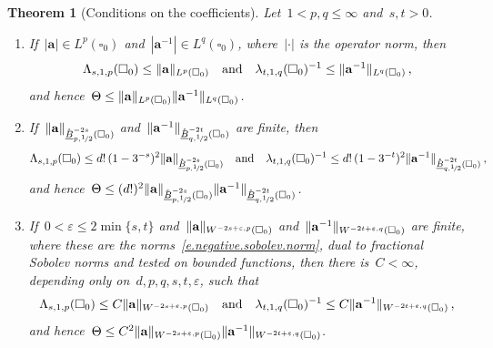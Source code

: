 \documentclass[11pt,letterpaper]{article}
\numberwithin{equation}{section}
\newtheorem{theoremA}{Theorem}
\theoremstyle{definition}
\renewcommand{\a}{\mathbf{a}}
\newcommand{\eps}{\varepsilon}
\newcommand{\nf}{\nicefrac}
\newcommand{\qand}{\quad\mbox{and}\quad}
\newcommand{\cu}{\square}
\DeclarePairedDelimiter{\norm}{\lVert}{\rVert}
\begin{document}
\begin{theoremA}[Conditions on the coefficients]
\label{t.coefficient.conditions}
Let~$1<p,q\leq\infty$ and~$s,t>0$.
\begin{enumerate}[label=\textup{(\roman*)},wide]
\item\label{c.classical.moments} If~$|\a|\in L^p(\cu_0)$ and~$|\a^{-1}|\in L^q(\cu_0)$, where~$|\cdot|$ is the operator norm, then
\begin{equation}
	\Lambda_{s,1,p}(\cu_0)\leq\norm{\a}_{L^p(\cu_0)}\qand \lambda_{t,1,q}(\cu_0)^{-1}\leq\norm{\a^{-1}}_{L^q(\cu_0)}\,,
	\label{e.classical.series}
\end{equation}
and hence~$\Theta\leq\norm{\a}_{L^p(\cu_0)}\norm{\a^{-1}}_{L^q(\cu_0)}$.
\item\label{c.negative.regularity} If~$\norm{\a}_{\mathring{\underline B}^{-2s}_{p,\nf12}(\cu_0)}$ and~$\norm{\a^{-1}}_{\mathring{\underline B}^{-2t}_{q,\nf12}(\cu_0)}$ are finite, then
\begin{equation}
	\Lambda_{s,1,p}(\cu_0)\leq d!\,(1-3^{-s})^2\norm{\a}_{\mathring{\underline B}^{-2s}_{p,\nf12}(\cu_0)}\qand\lambda_{t,1,q}(\cu_0)^{-1}\leq d!\,(1-3^{-t})^2\norm{\a^{-1}}_{\mathring{\underline B}^{-2t}_{q,\nf12}(\cu_0)}\,,
	\label{e.negative.regularity.series}
\end{equation}
and hence~$\Theta\leq(d!)^2\norm{\a}_{\mathring{\underline B}^{-2s}_{p,\nf12}(\cu_0)}\norm{\a^{-1}}_{\mathring{\underline B}^{-2t}_{q,\nf12}(\cu_0)}$.
\item\label{c.negative.sobolev} If~$0<\eps\leq2\min\{s,t\}$ and~$\norm{\a}_{W^{-2s+\eps,p}(\cu_0)}$ and~$\norm{\a^{-1}}_{W^{-2t+\eps,q}(\cu_0)}$ are finite, where these are the norms~\eqref{e.negative.sobolev.norm}, dual to fractional Sobolev norms and tested on bounded functions, then there is~$C<\infty$, depending only on~$d,p,q,s,t,\eps$, such that
\begin{equation}
	\Lambda_{s,1,p}(\cu_0)\leq C\norm{\a}_{W^{-2s+\eps,p}(\cu_0)}\qand\lambda_{t,1,q}(\cu_0)^{-1}\leq C\norm{\a^{-1}}_{W^{-2t+\eps,q}(\cu_0)}\,,
	\label{e.negative.sobolev.series}
\end{equation}
and hence~$\Theta\leq C^2\norm{\a}_{W^{-2s+\eps,p}(\cu_0)}\norm{\a^{-1}}_{W^{-2t+\eps,q}(\cu_0)}$.
\end{enumerate}
\end{theoremA}
\end{document}
